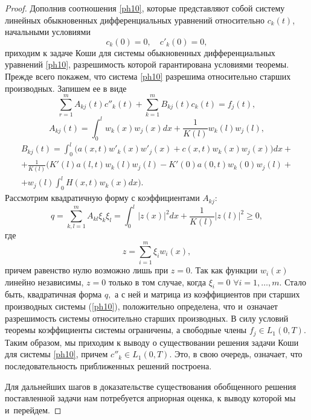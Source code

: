\begin{proof}
Дополнив соотношения \eqref{ph10}, которые представляют собой систему линейных обыкновенных дифференциальных уравнений
относительно $c_k(t)$, начальными условиями 
$$c_k(0)=0, \quad c'_k(0)=0,$$
приходим к задаче Коши  для системы обыкновенных дифференциальных
уравнений \eqref{ph10}, разрешимость которой гарантирована условиями теоремы.
Прежде всего покажем, что система \eqref{ph10} разрешима относительно старших производных.
Запишем ее в виде
$$\sum\limits_{r=1}^mA_{kj}(t)c''_k(t)+\sum\limits_{k=1}^mB_{kj}(t)c_k(t)=f_j(t),$$
$$A_{kj}(t)= \int _0^lw_k(x)w_j(x)dx+\frac{1}{K(l)}w_k(l)w_j(l),$$
\begin{multline}
B_{kj}(t)= \int _0^l \bigl(a(x,t)w'_k(x)w'_j(x)+c(x,t)w_k(x)w_j(x)\bigr)dx+
\\ 
+\frac{1}{K(l)} \biggl(K'(l)a(l,t)w_k(l)w_j(l)-K'(0)a(0,t)w_k(0)w_j(l)+ \\
 +
w_j(l) \int _0^lH(x,t)w_k(x)dx \biggr).
\end{multline}
Рассмотрим квадратичную форму с коэффициентами $A_{kj}$:
$$q=\sum\limits_{k,l=1}^mA_{kl}\xi_k\xi_l=
 \int _0^l|z(x)|^2dx+\frac{1}{K(l)}|z(l)|^2\geq 0,$$
где  $$z=\sum\limits_{i=1}^m\xi_iw_i(x),$$
причем равенство нулю возможно лишь при $z=0.$ 
Так как функции $w_i(x)$
линейно независимы,  $z=0$ только в том случае, когда $\xi_i=0$  $\forall i=1,\dots,m.$
Стало быть, квадратичная форма $q,$ а с ней и матрица из коэффициентов
 при старших производных системы (\ref{ph10}), положительно определена,
что и~означает разрешимость системы относительно старших производных.
 В силу условий теоремы  коэффициенты системы ограничены, а свободные члены  $f_j\in L_1(0, T).$
Таким образом, мы приходим к выводу о существовании решения задачи Коши для системы
\eqref{ph10}, причем $c''_k\in L_1(0, T).$
Это, в свою очередь, означает, что последовательность приближенных решений построена.

Для дальнейших шагов в доказательстве существования обобщенного решения поставленной задачи
нам потребуется априорная оценка, к выводу которой мы и~перейдем.


\end{proof}
